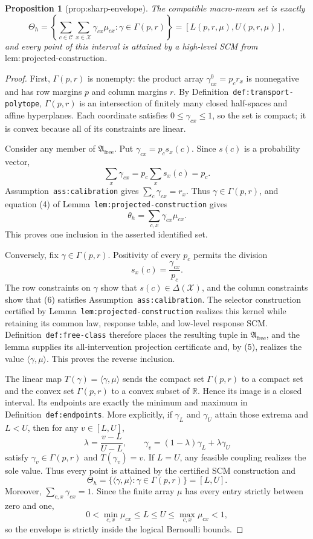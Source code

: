 \documentclass{article}
\newtheorem{proposition}{Proposition}
\begin{document}
\begin{proposition}[prop:sharp-envelope]\label{prop:sharp-envelope}
The compatible macro-mean set is exactly \[\Theta_h=\left\{\sum_{c\in\mathcal C}\sum_{x\in\mathcal X}\gamma_{cx}\mu_{cx}:\gamma\in\Gamma(p,r)\right\}=[L(p,r,\mu),U(p,r,\mu)],\] and every point of this interval is attained by a high-level SCM from \(\mathrm{lem:projected\text{-}construction}\).
\end{proposition}
\begin{proof}
First, \(\Gamma(p,r)\) is nonempty: the product array \(\gamma^0_{cx}=p_cr_x\) is nonnegative and has row margins \(p\) and column margins \(r\).  By Definition~\texttt{def:transport-polytope}, \(\Gamma(p,r)\) is an intersection of finitely many closed half-spaces and affine hyperplanes.  Each coordinate satisfies \(0\leq\gamma_{cx}\leq1\), so the set is compact; it is convex because all of its constraints are linear.

Consider any member of \(\mathfrak A_{\mathrm{free}}\).  Put \(\gamma_{cx}=p_cs_x(c)\).  Since \(s(c)\) is a probability vector,
\[
\sum_x\gamma_{cx}=p_c\sum_xs_x(c)=p_c.
\]
Assumption~\texttt{ass:calibration} gives \(\sum_c\gamma_{cx}=r_x\).  Thus \(\gamma\in\Gamma(p,r)\), and equation (4) of Lemma~\texttt{lem:projected-construction} gives
\[
\theta_h=\sum_{c,x}\gamma_{cx}\mu_{cx}.
\tag{5}
\]
This proves one inclusion in the asserted identified set.

Conversely, fix \(\gamma\in\Gamma(p,r)\).  Positivity of every \(p_c\) permits the division
\[
s_x(c)=\frac{\gamma_{cx}}{p_c}.
\tag{6}
\]
The row constraints on \(\gamma\) show that \(s(c)\in\Delta(\mathcal X)\), and the column constraints show that (6) satisfies Assumption~\texttt{ass:calibration}.  The selector construction certified by Lemma~\texttt{lem:projected-construction} realizes this kernel while retaining its common law, response table, and low-level response SCM.  Definition~\texttt{def:free-class} therefore places the resulting tuple in \(\mathfrak A_{\mathrm{free}}\), and the lemma supplies its all-intervention projection certificate and, by (5), realizes the value \(\langle\gamma,\mu\rangle\).  This proves the reverse inclusion.

The linear map \(T(\gamma)=\langle\gamma,\mu\rangle\) sends the compact set \(\Gamma(p,r)\) to a compact set and the convex set \(\Gamma(p,r)\) to a convex subset of \(\mathbb R\).  Hence its image is a closed interval.  Its endpoints are exactly the minimum and maximum in Definition~\texttt{def:endpoints}.  More explicitly, if \(\gamma_L\) and \(\gamma_U\) attain those extrema and \(L<U\), then for any \(v\in[L,U]\),
\[
\lambda=\frac{v-L}{U-L},\qquad
\gamma_v=(1-\lambda)\gamma_L+\lambda\gamma_U
\]
satisfy \(\gamma_v\in\Gamma(p,r)\) and \(T(\gamma_v)=v\).  If \(L=U\), any feasible coupling realizes the sole value.  Thus every point is attained by the certified SCM construction and
\[
\Theta_h=\{\langle\gamma,\mu\rangle:\gamma\in\Gamma(p,r)\}=[L,U].
\]
Moreover, \(\sum_{c,x}\gamma_{cx}=1\).  Since the finite array \(\mu\) has every entry strictly between zero and one,
\[
0<\min_{c,x}\mu_{cx}\leq L\leq U\leq\max_{c,x}\mu_{cx}<1,
\]
so the envelope is strictly inside the logical Bernoulli bounds.


\end{proof}
\end{document}
